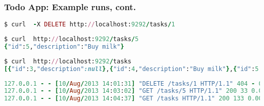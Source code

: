 \documentclass{beamer}
\begin{document}
\begin{frame}[fragile]\frametitle{Todo App: Example runs, cont.} 

  \begin{lstlisting}[language=ruby, escapechar={^}]
$ curl  -X DELETE http://localhost:9292/tasks/1
  \end{lstlisting}

  \begin{lstlisting}[language=ruby, escapechar={^}]
$ curl  http://localhost:9292/tasks/5
{"id":5,"description":"Buy milk"}
  \end{lstlisting}

  \begin{lstlisting}[language=ruby, escapechar={^}]
$ curl  http://localhost:9292/tasks
[{"id":3,"description":null},{"id":4,"description":"Buy milk"},{"id":5,"description":"Buy milk"},{"id":6,"description":"Buy apples"}]
  \end{lstlisting}

  \begin{lstlisting}[language=ruby, basicstyle=\tiny, escapechar={^}]
127.0.0.1 - - [10/Aug/2013 14:01:31] "DELETE /tasks/1 HTTP/1.1" 404 - 0.0016
127.0.0.1 - - [10/Aug/2013 14:03:02] "GET /tasks/5 HTTP/1.1" 200 33 0.0017
127.0.0.1 - - [10/Aug/2013 14:04:37] "GET /tasks HTTP/1.1" 200 133 0.0018
  \end{lstlisting}

\end{frame}
\end{document}
